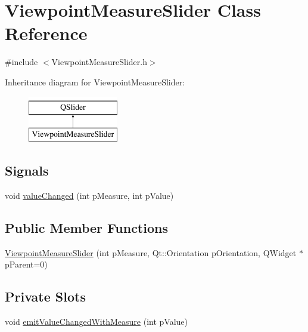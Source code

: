 \hypertarget{class_viewpoint_measure_slider}{\section{Viewpoint\+Measure\+Slider Class Reference}
\label{class_viewpoint_measure_slider}
}


{\ttfamily \#include $<$Viewpoint\+Measure\+Slider.\+h$>$}

Inheritance diagram for Viewpoint\+Measure\+Slider\+:\begin{figure}[H]
\begin{center}
\leavevmode
\includegraphics[height=2.000000cm]{class_viewpoint_measure_slider}
\end{center}
\end{figure}
\subsection*{Signals}
\begin{DoxyCompactItemize}
\item 
void \hyperlink{class_viewpoint_measure_slider_abdc73635f6b798836aa96fb9c95a00cc}{value\+Changed} (int p\+Measure, int p\+Value)
\end{DoxyCompactItemize}
\subsection*{Public Member Functions}
\begin{DoxyCompactItemize}
\item 
\hyperlink{class_viewpoint_measure_slider_a2718566455fcedd44a1b54f068e993cc}{Viewpoint\+Measure\+Slider} (int p\+Measure, Qt\+::\+Orientation p\+Orientation, Q\+Widget $\ast$p\+Parent=0)
\end{DoxyCompactItemize}
\subsection*{Private Slots}
\begin{DoxyCompactItemize}
\item 
void \hyperlink{class_viewpoint_measure_slider_aaaef1eaffad291ebb0567a9558da59f8}{emit\+Value\+Changed\+With\+Measure} (int p\+Value)
\end{DoxyCompactItemize}
